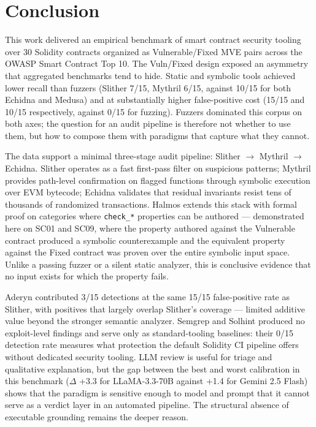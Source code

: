 \section{Conclusion}

This work delivered an empirical benchmark of smart contract security tooling over 30 Solidity contracts organized as Vulnerable/Fixed MVE pairs across the OWASP Smart Contract Top 10. The Vuln/Fixed design exposed an asymmetry that aggregated benchmarks tend to hide. Static and symbolic tools achieved lower recall than fuzzers (Slither 7/15, Mythril 6/15, against 10/15 for both Echidna and Medusa) and at substantially higher false-positive cost (15/15 and 10/15 respectively, against 0/15 for fuzzing). Fuzzers dominated this corpus on both axes; the question for an audit pipeline is therefore not whether to use them, but how to compose them with paradigms that capture what they cannot.

The data support a minimal three-stage audit pipeline: Slither $\rightarrow$ Mythril $\rightarrow$ Echidna. Slither operates as a fast first-pass filter on suspicious patterns; Mythril provides path-level confirmation on flagged functions through symbolic execution over EVM bytecode; Echidna validates that residual invariants resist tens of thousands of randomized transactions. Halmos extends this stack with formal proof on categories where \texttt{check\_*} properties can be authored — demonstrated here on SC01 and SC09, where the property authored against the Vulnerable contract produced a symbolic counterexample and the equivalent property against the Fixed contract was proven over the entire symbolic input space. Unlike a passing fuzzer or a silent static analyzer, this is conclusive evidence that no input exists for which the property fails.

Aderyn contributed 3/15 detections at the same 15/15 false-positive rate as Slither, with positives that largely overlap Slither's coverage — limited additive value beyond the stronger semantic analyzer. Semgrep and Solhint produced no exploit-level findings and serve only as standard-tooling baselines: their 0/15 detection rate measures what protection the default Solidity CI pipeline offers without dedicated security tooling. LLM review is useful for triage and qualitative explanation, but the gap between the best and worst calibration in this benchmark ($\Delta$ +3.3 for LLaMA-3.3-70B against +1.4 for Gemini 2.5 Flash) shows that the paradigm is sensitive enough to model and prompt that it cannot serve as a verdict layer in an automated pipeline. The structural absence of executable grounding remains the deeper reason.

